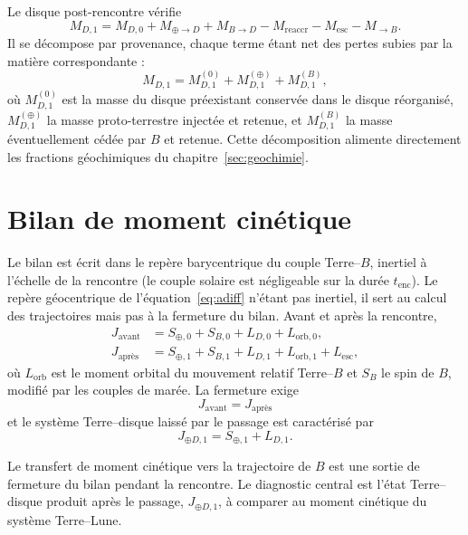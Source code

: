 \documentclass[11pt,a4paper,openany]{report}
\begin{document}
Le disque post-rencontre vérifie
\begin{equation}
M_{D,1}=M_{D,0}+M_{\oplus\to D}+M_{B\to D}-M_{\mathrm{reaccr}}-M_{\mathrm{esc}}-M_{\to B}.
\label{eq:bilanM1}
\end{equation}
Il se décompose par provenance, chaque terme étant net des pertes subies par la matière
correspondante :
\begin{equation}
M_{D,1}=M_{D,1}^{(0)}+M_{D,1}^{(\oplus)}+M_{D,1}^{(B)},
\label{eq:provenance}
\end{equation}
où $M_{D,1}^{(0)}$ est la masse du disque préexistant conservée dans le disque réorganisé,
$M_{D,1}^{(\oplus)}$ la masse proto-terrestre injectée et retenue, et $M_{D,1}^{(B)}$ la masse
éventuellement cédée par $B$ et retenue. Cette décomposition alimente directement les fractions
géochimiques du chapitre~\ref{sec:geochimie}.

\section{Bilan de moment cinétique}

Le bilan est écrit dans le repère barycentrique du couple Terre--$B$, inertiel à l'échelle de la
rencontre (le couple solaire est négligeable sur la durée $t_{\mathrm{enc}}$). Le repère
géocentrique de l'équation~\eqref{eq:adiff} n'étant pas inertiel, il sert au calcul des
trajectoires mais pas à la fermeture du bilan. Avant et après la rencontre,
\begin{align}
J_{\mathrm{avant}}&=S_{\oplus,0}+S_{B,0}+L_{D,0}+L_{\mathrm{orb},0},
\label{eq:Javant}\\
J_{\text{après}}&=S_{\oplus,1}+S_{B,1}+L_{D,1}+L_{\mathrm{orb},1}+L_{\mathrm{esc}},
\label{eq:Japres}
\end{align}
où $L_{\mathrm{orb}}$ est le moment orbital du mouvement relatif Terre--$B$ et $S_B$ le spin de $B$,
modifié par les couples de marée. La fermeture exige
\begin{equation}
\boxed{\;J_{\mathrm{avant}}=J_{\text{après}}\;}
\label{eq:fermeture}
\end{equation}
et le système Terre--disque laissé par le passage est caractérisé par
\begin{equation}
J_{\oplus D,1}=S_{\oplus,1}+L_{D,1}.
\label{eq:J1}
\end{equation}

\begin{controle}
Le transfert de moment cinétique vers la trajectoire de $B$ est une sortie de fermeture du bilan
pendant la rencontre. Le diagnostic central est l'état Terre--disque produit après le passage,
$J_{\oplus D,1}$, à comparer au moment cinétique du système Terre--Lune.
\end{controle}
\end{document}
